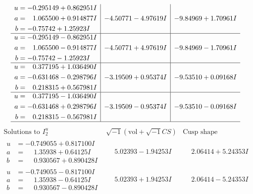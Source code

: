 \documentclass[1p]{elsarticle_modified}
\theoremstyle{definition}
\newcommand{\I}{\sqrt{-1}}
\begin{document}
$$\begin{array}{c|c|c}
\begin{aligned}
u &= -0.295149 + 0.862951 I \\
a &= \phantom{-}1.065500 + 0.914877 I \\
b &= -0.75742 + 1.25923 I\end{aligned}
 & -4.50771 - 4.97619 I & -9.84969 + 1.70961 I \\ \hline\begin{aligned}
u &= -0.295149 - 0.862951 I \\
a &= \phantom{-}1.065500 - 0.914877 I \\
b &= -0.75742 - 1.25923 I\end{aligned}
 & -4.50771 + 4.97619 I & -9.84969 - 1.70961 I \\ \hline\begin{aligned}
u &= \phantom{-}0.377195 + 1.036490 I \\
a &= -0.631468 - 0.298796 I \\
b &= \phantom{-}0.218315 + 0.567981 I\end{aligned}
 & -3.19509 + 0.95374 I & -9.53510 + 0.09168 I \\ \hline\begin{aligned}
u &= \phantom{-}0.377195 - 1.036490 I \\
a &= -0.631468 + 0.298796 I \\
b &= \phantom{-}0.218315 - 0.567981 I\end{aligned}
 & -3.19509 - 0.95374 I & -9.53510 - 0.09168 I\\
 \hline 
 \end{array}$$\newpage$$\begin{array}{c|c|c}  
\text{Solutions to }I^u_{2}& \I (\text{vol} + \sqrt{-1}CS) & \text{Cusp shape}\\
 \hline 
\begin{aligned}
u &= -0.749055 + 0.817100 I \\
a &= \phantom{-}1.35938 + 0.64125 I \\
b &= \phantom{-}0.930567 + 0.890428 I\end{aligned}
 & \phantom{-}5.02393 - 1.94253 I & \phantom{-}2.06414 + 5.24353 I \\ \hline\begin{aligned}
u &= -0.749055 - 0.817100 I \\
a &= \phantom{-}1.35938 - 0.64125 I \\
b &= \phantom{-}0.930567 - 0.890428 I\end{aligned}
 & \phantom{-}5.02393 + 1.94253 I & \phantom{-}2.06414 - 5.24353 I \\ \hline\begin{aligned}

\end{aligned}
\end{array}$$
\end{document}
